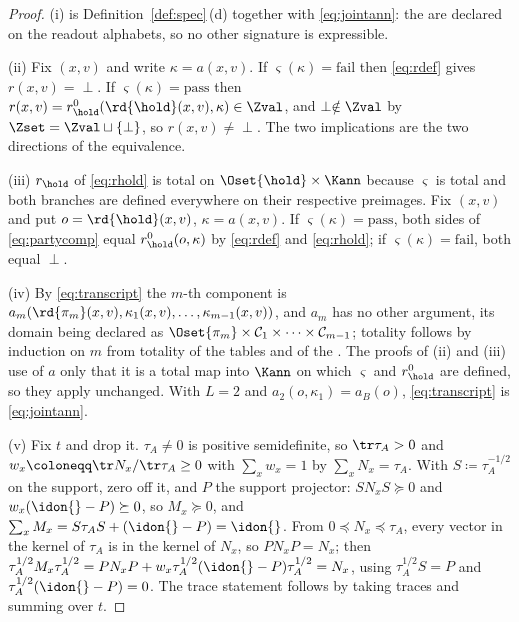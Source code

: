 \begin{proof}
(i) is Definition~\ref{def:spec}\,(d) together with \eqref{eq:jointann}: the
 are declared on the readout alphabets, so no other
signature is expressible.

(ii) Fix $(x,v)$ and write $\kappa=a(x,v)$. If
$\varsigma(\kappa)=\mathrm{fail}$ then \eqref{eq:rdef} gives $r(x,v)=\perp$. If
$\varsigma(\kappa)=\mathrm{pass}$ then
$r(x,v)=r^{0}_{\hold}(\rd{\hold}(x,v),\kappa)\in\Zval$, and $\perp\notin\Zval$
by $\Zset=\Zval\sqcup\{\perp\}$, so $r(x,v)\ne\perp$. The two implications are
the two directions of the equivalence.

(iii) $r_{\hold}$ of \eqref{eq:rhold} is total on $\Oset{\hold}\times\Kann$
because $\varsigma$ is total and both branches are defined everywhere on their
respective preimages. Fix $(x,v)$ and put $o=\rd{\hold}(x,v)$,
$\kappa=a(x,v)$. If $\varsigma(\kappa)=\mathrm{pass}$, both sides of
\eqref{eq:partycomp} equal $r^{0}_{\hold}(o,\kappa)$ by \eqref{eq:rdef} and
\eqref{eq:rhold}; if $\varsigma(\kappa)=\mathrm{fail}$, both equal $\perp$.

(iv) By \eqref{eq:transcript} the $m$-th component is
$a_m(\rd{\pi_m}(x,v),\kappa_1(x,v),\dots,\kappa_{m-1}(x,v))$, and $a_m$ has
no other argument, its domain being declared as
$\Oset{\pi_m}\times\mathcal{C}_1\times\dots\times\mathcal{C}_{m-1}$; totality
follows by induction on $m$ from totality of the tables and of the
. The proofs of (ii) and (iii) use of $a$ only that it is a
total map into $\Kann$ on which $\varsigma$ and $r^{0}_{\hold}$ are defined, so
they apply unchanged. With $L=2$ and $a_2(o,\kappa_1)=a_B(o)$,
\eqref{eq:transcript} is \eqref{eq:jointann}.

(v) Fix $t$ and drop it. $\tau_A\ne0$ is positive semidefinite, so
$\tr\tau_A>0$ and $w_x\coloneqq\tr N_x/\tr\tau_A\ge0$ with $\sum_xw_x=1$ by
$\sum_xN_x=\tau_A$. With $S\coloneqq\tau_A^{-1/2}$ on the support, zero off
it, and $P$ the support projector: $SN_xS\succeq0$ and
$w_x(\idon{}-P)\succeq0$, so $M_x\succeq0$, and
$\sum_xM_x=S\tau_AS+(\idon{}-P)=\idon{}$. From
$0\preceq N_x\preceq\tau_A$, every vector in the kernel of $\tau_A$ is in
the kernel of $N_x$, so $PN_xP=N_x$; then
$\tau_A^{1/2}M_x\tau_A^{1/2}=PN_xP+w_x\tau_A^{1/2}(\idon{}-P)\tau_A^{1/2}
=N_x$, using $\tau_A^{1/2}S=P$ and $\tau_A^{1/2}(\idon{}-P)=0$. The trace
statement follows by taking traces and summing over $t$.


\end{proof}

